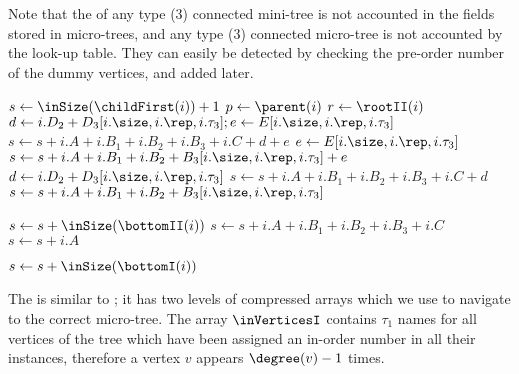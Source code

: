 Note that the \inSize{} of any type (3) connected mini-tree is not accounted in the fields stored in micro-trees, and any type (3) connected micro-tree is not accounted by the look-up table.
They can easily be detected by checking the pre-order number of the dummy vertices, and added later.

\begin{algorithm}
\begin{algorithmic}
		\State {}
	\Else
		\State $s \gets \inSize(\childFirst(i)) + 1$
			\State $p \gets \parent(i)$
				\State $r \gets \rootII(i)$
				 
					\State $d \gets i.D_2 + D_3[i.\size, i.\rep, i.\tau_3]; e \gets E[i.\size, i.\rep, i.\tau_3]$
					\State $s \gets s + i.A + i.B_1 + i.B_2 + i.B_3 + i.C + d + e$
				\Else {}
					\State $e \gets E[i.\size, i.\rep, i.\tau_3]$
					\State $s \gets s + i.A + i.B_1 + i.B_2 + B_3[i.\size, i.\rep, i.\tau_3] + e$
				\EndIf
			 
				\State $d \gets i.D_2 + D_3[i.\size, i.\rep, i.\tau_3]$
				\State $s \gets s + i.A + i.B_1 + i.B_2 + i.B_3 + i.C + d$
			\Else {}
				\State $s \gets s + i.A + i.B_1 + i.B_2 + B_3[i.\size, i.\rep, i.\tau_3]$
			\EndIf
			
					\State $s \gets s + \inSize(\bottomII(i))$ 
				\EndIf
			\EndIf
		 
			\State $s \gets s + i.A + i.B_1 + i.B_2 + i.B_3 + i.C$
		\Else {}
			\State $s \gets s + i.A$
		\EndIf
		
				\State $s \gets s + \inSize(\bottomI(i))$ 
			\EndIf
		\EndIf
	\EndIf
\EndFunction
\end{algorithmic}
\end{algorithm}

\bigbreak

The \inSelect{} is similar to \preSelect{}; it has two levels of compressed arrays which we use to navigate to the correct micro-tree.
The array $\inVerticesI$ contains $\tau_1$ names for all vertices of the tree which have been assigned an in-order number in all their instances, therefore a vertex $v$ appears $\degree(v) - 1$ times.

